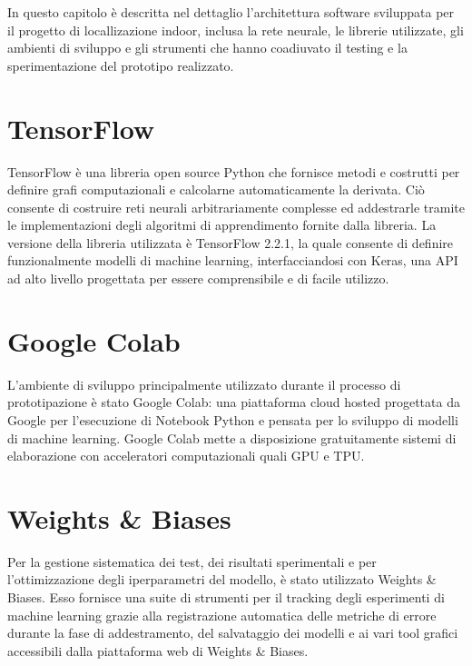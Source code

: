 
\newcommand{\yhatone}{\bm\hat{\bm y}_1}
\newcommand{\yhattwo}{\bm\hat{\bm y}_2}
\newcommand{\yold}{\bm y_{\mathit{old}}}
In questo capitolo è descritta nel dettaglio l'architettura software sviluppata
per il progetto di locallizazione indoor, inclusa la rete neurale, le librerie
utilizzate, gli ambienti di sviluppo e gli strumenti che hanno coadiuvato il
testing e la sperimentazione del prototipo realizzato.
\section{TensorFlow}
TensorFlow è una libreria open source Python che fornisce metodi e costrutti per definire
grafi computazionali e calcolarne automaticamente la derivata. Ciò consente di
costruire reti neurali arbitrariamente complesse ed addestrarle tramite le
implementazioni degli algoritmi di apprendimento fornite dalla libreria. La
versione della libreria utilizzata è TensorFlow 2.2.1, la quale consente di
definire funzionalmente modelli di machine learning, interfacciandosi con
Keras, una API ad alto livello progettata per essere comprensibile e di facile
utilizzo.
\section{Google Colab}
L'ambiente di sviluppo principalmente utilizzato durante il processo di
prototipazione è stato Google Colab: una piattaforma cloud hosted progettata da
Google per l'esecuzione di Notebook Python e pensata per lo sviluppo di modelli
di machine learning. Google Colab mette a disposizione gratuitamente sistemi di
elaborazione con acceleratori computazionali quali GPU e TPU\@.
\section{Weights \& Biases}
Per la gestione sistematica dei test, dei risultati sperimentali e per
l'ottimizzazione degli iperparametri del modello, è stato utilizzato Weights \&
Biases. Esso fornisce una suite di strumenti per il tracking degli esperimenti
di machine learning grazie alla registrazione automatica delle metriche di
errore durante la fase di addestramento, del salvataggio dei modelli e ai vari
tool grafici accessibili dalla piattaforma web di Weights \& Biases.

